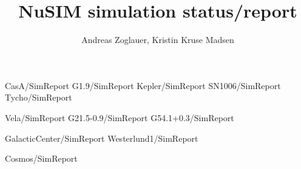 \documentclass[12pt]{article}
\begin{document}
\title{NuSIM simulation status/report}
\author{Andreas Zoglauer, Kristin Kruse Madsen}



\maketitle
\tableofcontents

\newpage

 {CasA/SimReport}
 {G1.9/SimReport}
 {Kepler/SimReport}
 {SN1006/SimReport}
 {Tycho/SimReport}

 {Vela/SimReport}
 {G21.5-0.9/SimReport}
 {G54.1+0.3/SimReport}

 {GalacticCenter/SimReport}
 {Westerlund1/SimReport}

 {Cosmos/SimReport}
\end{document}
